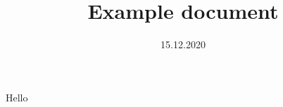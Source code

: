 \documentclass{article}
\title{Example document}
\date{15.12.2020}
\begin{document}
\maketitle

Hello
\end{document}
